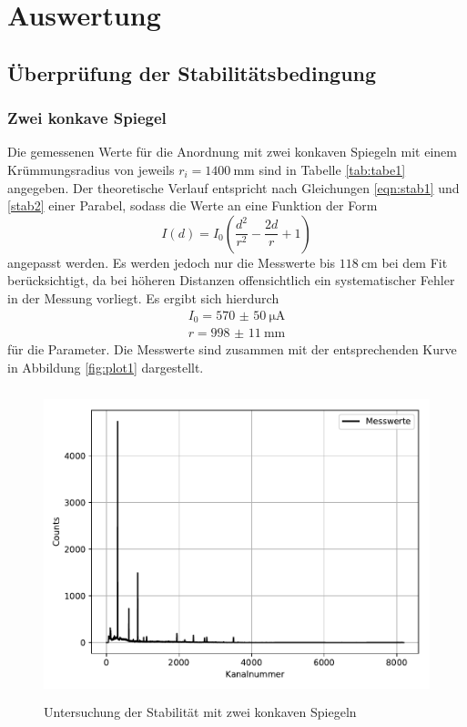 \section{Auswertung}
\label{sec:Auswertung}



\subsection{Überprüfung der Stabilitätsbedingung}

\subsubsection{Zwei konkave Spiegel}
Die gemessenen Werte für die Anordnung mit zwei konkaven Spiegeln mit einem
Krümmungsradius von jeweils $r_i = \SI{1400}{\milli\meter}$ sind in Tabelle \ref{tab:tabe1}
angegeben. Der theoretische Verlauf entspricht nach Gleichungen \ref{eqn:stab1}
und \ref{stab2} einer Parabel,
sodass die Werte an eine Funktion der Form
\begin{equation}
  I(d)= I_0(\frac{d^2}{r^2}-\frac{2d}{r}+1)
\end{equation}
angepasst werden. Es werden jedoch nur die Messwerte bis $\SI{118}{\centi\meter}$
bei dem Fit berücksichtigt, da bei höheren Distanzen offensichtlich ein systematischer
Fehler in der Messung vorliegt.
Es ergibt sich hierdurch
\begin{align*}
  I_0= \SI{570(50)}{\micro\ampere} \\
  r=\SI{998(11)}{\milli\meter}
\end{align*}
für die Parameter. Die Messwerte sind zusammen mit der
entsprechenden Kurve in Abbildung \ref{fig:plot1} dargestellt.
\begin{figure}
  \centering
  \includegraphics[height=9cm]{Plot1.pdf}
  \caption{Untersuchung der Stabilität mit zwei konkaven Spiegeln}
  \label{fig:plot3}
\end{figure}

